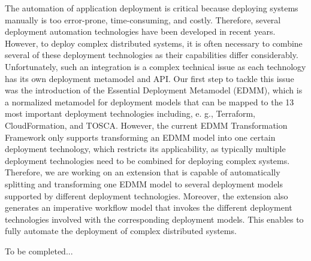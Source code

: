 \documentclass[a4paper,UKenglish]{dagrep-v2018}
\begin{document}

\license

The automation of application deployment is critical because deploying systems manually is too error-prone, time-consuming, and costly. Therefore, several deployment automation technologies have been developed in recent years. However, to deploy complex distributed systems, it is often necessary to combine several of these deployment technologies as their capabilities differ considerably. Unfortunately, such an integration is a complex technical issue as each technology has its own deployment metamodel and API. Our first step to tackle this issue was the introduction of the Essential Deployment Metamodel (EDMM), which is a normalized metamodel for deployment models that can be mapped to the 13 most important deployment technologies including, e. g., Terraform, CloudFormation, and TOSCA. However, the current EDMM Transformation Framework only supports transforming an EDMM model into one certain deployment technology, which restricts its applicability, as typically multiple deployment technologies need to be combined for deploying complex systems. Therefore, we are working on an extension that is capable of automatically splitting and transforming one EDMM model to several  deployment models supported by different deployment technologies. Moreover, the extension also generates an imperative workflow model that invokes the different deployment technologies involved with the corresponding deployment models. This enables to fully automate the deployment of complex distributed systems.


\license

To be completed...


\license
\end{document}
